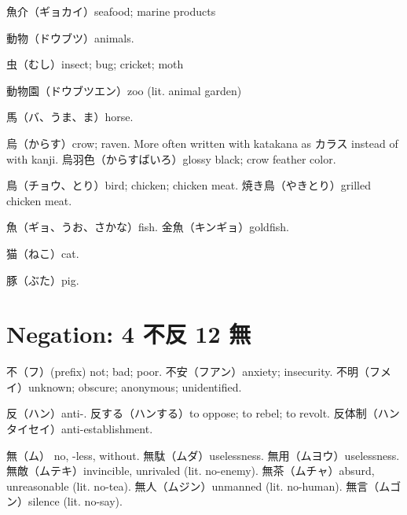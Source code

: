 魚介（ギョカイ）seafood; marine products

動物（ドウブツ）animals.

虫（むし）insect; bug; cricket; moth

動物園（ドウブツエン）zoo (lit. animal garden)

馬（バ、うま、ま）horse.

烏（からす）crow; raven.
More often written with katakana as カラス instead of with kanji.
烏羽色（からすばいろ）glossy black; crow feather color.

鳥（チョウ、とり）bird; chicken; chicken meat.
焼き鳥（やきとり）grilled chicken meat.

魚（ギョ、うお、さかな）fish.
金魚（キンギョ）goldfish.

猫（ねこ）cat.

豚（ぶた）pig.

\section{Negation: 4 不反 12 無}

不（フ）(prefix) not; bad; poor.
不安（フアン）anxiety; insecurity.
不明（フメイ）unknown; obscure; anonymous; unidentified.

反（ハン）anti-.
反する（ハンする）to oppose; to rebel; to revolt.
反体制（ハンタイセイ）anti-establishment.

無（ム） no, -less, without.
無駄（ムダ）uselessness.
無用（ムヨウ）uselessness.
無敵（ムテキ）invincible, unrivaled (lit. no-enemy).
無茶（ムチャ）absurd, unreasonable (lit. no-tea).
無人（ムジン）unmanned (lit. no-human).
無言（ムゴン）silence (lit. no-say).

